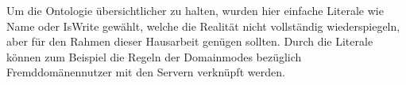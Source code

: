 Um die Ontologie übersichtlicher zu halten, wurden hier einfache Literale wie \glqq Name \grqq{} oder \glqq IsWrite\grqq{} gewählt, welche die Realität nicht vollständig wiederspiegeln, aber für den Rahmen dieser Hausarbeit genügen sollten. Durch die Literale können zum Beispiel die Regeln der Domainmodes bezüglich Fremddomänennutzer mit den Servern verknüpft werden. 